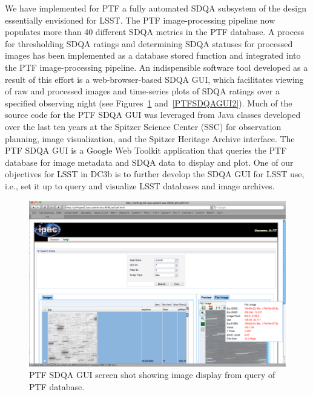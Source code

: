 We have
implemented for PTF a fully automated SDQA subsystem of the design essentially
envisioned for LSST.  The PTF image-processing pipeline now populates more than 40 different
SDQA metrics in the PTF database.  A process for thresholding SDQA ratings and determining 
SDQA statuses for processed images has been implemented as a database stored function and
integrated into the PTF image-processing pipeline.  An indispensible software tool developed 
as a result of this effort is a web-browser-based SDQA GUI, which facilitates viewing of raw and
processed images and time-series plots of SDQA ratings over a specified observing night 
(see Figures~\ref{PTFSDQAGUI1} and~\ref{PTFSDQAGUI2}).  Much of the source 
code for the PTF SDQA GUI was leveraged from Java classes developed over the last ten years at 
the Spitzer Science Center (SSC) for observation planning, image visualization, and the
Spitzer Heritage Archive interface.  The PTF SDQA GUI is a Google Web Toolkit application that
queries the PTF database for image metadata and SDQA data to display and plot.  One of our
objectives for LSST in DC3b is to further develop the SDQA GUI for LSST use, i.e., set it up to 
query and visualize LSST databases and image archives.

\begin{figure}[htbp]
\begin{centering}
\includegraphics[width=5in]{images/PTFSDQSGUI1}
\caption{PTF SDQA GUI screen shot showing image display from query of PTF database.} 
 \label{PTFSDQAGUI1}
\end{centering}
\end{figure}

